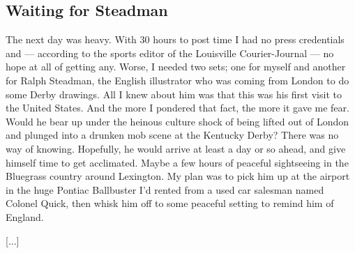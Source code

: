 \documentclass[10pt,a4paper]{article}
\begin{document}
\subsection{Waiting for Steadman}

The next day was heavy. With 30 hours to post time I had no press credentials and — according to the sports editor of the Louisville Courier-Journal — no hope at all of getting any. Worse, I needed two sets; one for myself and another for Ralph Steadman, the English illustrator who was coming from London to do some Derby drawings. All I knew about him was that this was his first visit to the United States. And the more I pondered that fact, the more it gave me fear. Would he bear up under the heinous culture shock of being lifted out of London and plunged into a drunken mob scene at the Kentucky Derby? There was no way of knowing. Hopefully, he would arrive at least a day or so ahead, and give himself time to get acclimated. Maybe a few hours of peaceful sightseeing in the Bluegrass country around Lexington. My plan was to pick him up at the airport in the huge Pontiac Ballbuster I’d rented from a used car salesman named Colonel Quick, then whisk him off to some peaceful setting to remind him of England.

[...]
\end{document}
